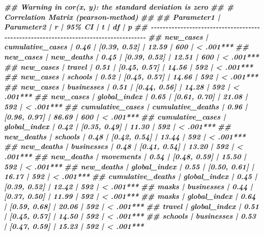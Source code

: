 \documentclass[
]{book}
\newenvironment{Shaded}{\begin{snugshade}}{\end{snugshade}}
\newcommand{\DocumentationTok}[1]{\textcolor[rgb]{0.56,0.35,0.01}{\textbf{\textit{#1}}}}
\begin{document}
\begin{Shaded}
\begin{Highlighting}[]
\DocumentationTok{\#\# Warning in cor(x, y): the standard deviation is zero}
\DocumentationTok{\#\# \# Correlation Matrix (pearson{-}method)}
\DocumentationTok{\#\# }
\DocumentationTok{\#\# Parameter1        |        Parameter2 |    r |       95\% CI |     t |  df |         p}
\DocumentationTok{\#\# {-}{-}{-}{-}{-}{-}{-}{-}{-}{-}{-}{-}{-}{-}{-}{-}{-}{-}{-}{-}{-}{-}{-}{-}{-}{-}{-}{-}{-}{-}{-}{-}{-}{-}{-}{-}{-}{-}{-}{-}{-}{-}{-}{-}{-}{-}{-}{-}{-}{-}{-}{-}{-}{-}{-}{-}{-}{-}{-}{-}{-}{-}{-}{-}{-}{-}{-}{-}{-}{-}{-}{-}{-}{-}{-}{-}{-}{-}{-}{-}{-}{-}{-}{-}{-}}
\DocumentationTok{\#\# new\_cases         |  cumulative\_cases | 0.46 | [0.39, 0.52] | 12.59 | 600 | \textless{} .001***}
\DocumentationTok{\#\# new\_cases         |        new\_deaths | 0.45 | [0.39, 0.52] | 12.51 | 600 | \textless{} .001***}
\DocumentationTok{\#\# new\_cases         |            travel | 0.51 | [0.45, 0.57] | 14.56 | 592 | \textless{} .001***}
\DocumentationTok{\#\# new\_cases         |           schools | 0.52 | [0.45, 0.57] | 14.66 | 592 | \textless{} .001***}
\DocumentationTok{\#\# new\_cases         |        businesses | 0.51 | [0.44, 0.56] | 14.28 | 592 | \textless{} .001***}
\DocumentationTok{\#\# new\_cases         |      global\_index | 0.65 | [0.61, 0.70] | 21.08 | 592 | \textless{} .001***}
\DocumentationTok{\#\# cumulative\_cases  | cumulative\_deaths | 0.96 | [0.96, 0.97] | 86.69 | 600 | \textless{} .001***}
\DocumentationTok{\#\# cumulative\_cases  |      global\_index | 0.42 | [0.35, 0.49] | 11.30 | 592 | \textless{} .001***}
\DocumentationTok{\#\# new\_deaths        |           schools | 0.48 | [0.42, 0.54] | 13.44 | 592 | \textless{} .001***}
\DocumentationTok{\#\# new\_deaths        |        businesses | 0.48 | [0.41, 0.54] | 13.20 | 592 | \textless{} .001***}
\DocumentationTok{\#\# new\_deaths        |         movements | 0.54 | [0.48, 0.59] | 15.50 | 592 | \textless{} .001***}
\DocumentationTok{\#\# new\_deaths        |      global\_index | 0.55 | [0.50, 0.61] | 16.17 | 592 | \textless{} .001***}
\DocumentationTok{\#\# cumulative\_deaths |      global\_index | 0.45 | [0.39, 0.52] | 12.42 | 592 | \textless{} .001***}
\DocumentationTok{\#\# masks             |        businesses | 0.44 | [0.37, 0.50] | 11.99 | 592 | \textless{} .001***}
\DocumentationTok{\#\# masks             |      global\_index | 0.64 | [0.59, 0.68] | 20.06 | 592 | \textless{} .001***}
\DocumentationTok{\#\# travel            |      global\_index | 0.51 | [0.45, 0.57] | 14.50 | 592 | \textless{} .001***}
\DocumentationTok{\#\# schools           |        businesses | 0.53 | [0.47, 0.59] | 15.23 | 592 | \textless{} .001***}

\end{Highlighting}
\end{Shaded}
\end{document}

